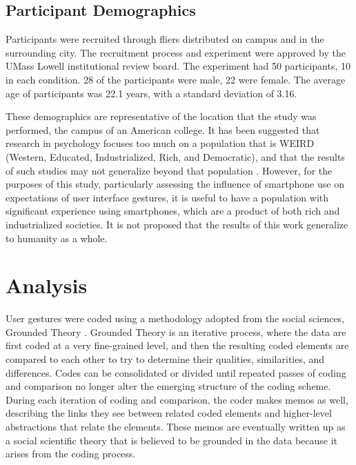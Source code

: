 \subsection{Participant Demographics} \label{section:Participant_Demographics}

Participants were recruited through fliers distributed on campus and in the surrounding city. 
The recruitment process and experiment were approved by the UMass Lowell institutional review board.
The experiment had 50 participants, 10 in each condition. 28 of the participants were male, 22 were female. The average age of participants was 22.1 years, with a standard deviation of 3.16. 

These demographics are representative of the location that the study was performed, the campus of an American college. 
It has been suggested that research in psychology focuses too much on a population that is WEIRD (Western, Educated, Industrialized, Rich, and Democratic), and that the results of such studies may not generalize beyond that population \citep{arnett2008neglected}.
However, for the purposes of this study, particularly assessing the influence of smartphone use on expectations of user interface gestures, it is useful to have a population with significant experience using smartphones, which are a product of both rich and industrialized societies. 
It is not proposed that the results of this work generalize to humanity as a whole.  

\section{Analysis} \label{section:Analysis}

User gestures were coded using a methodology adopted from the social sciences, Grounded Theory \citep{glaser2017discovery}.
Grounded Theory is an iterative process, where the data are first coded at a very fine-grained level, and then the resulting coded elements are compared to each other to try to determine their qualities, similarities, and differences. 
Codes can be consolidated or divided until repeated passes of coding and comparison no longer alter the emerging structure of the coding scheme. 
During each iteration of coding and comparison, the coder makes memos as well, describing the links they see between related coded elements and higher-level abstractions that relate the elements. 
These memos are eventually written up as a social scientific theory that is believed to be grounded in the data because it arises from the coding process. 

